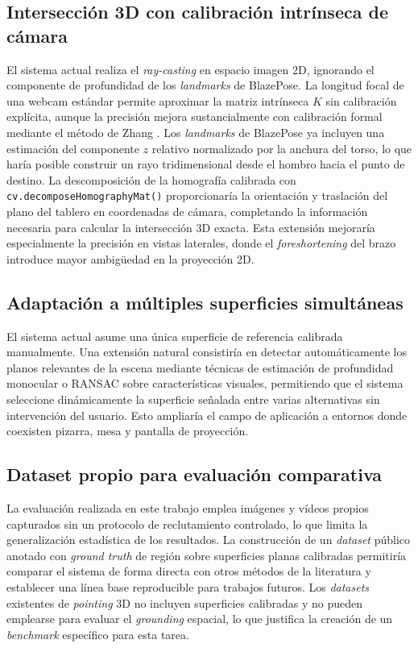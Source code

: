 \documentclass[12pt]{report} %
\begin{document}
\subsection{Intersección 3D con calibración intrínseca de cámara}

El sistema actual realiza el \textit{ray-casting} en espacio imagen 2D, ignorando el componente de profundidad de los \textit{landmarks} de BlazePose. La longitud focal de una webcam estándar permite aproximar la matriz intrínseca $K$ sin calibración explícita, aunque la precisión mejora sustancialmente con calibración formal mediante el método de Zhang \citep{zhang2000flexible}. Los \textit{landmarks} de BlazePose ya incluyen una estimación del componente $z$ relativo normalizado por la anchura del torso, lo que haría posible construir un rayo tridimensional desde el hombro hacia el punto de destino. La descomposición de la homografía calibrada con \texttt{cv.decomposeHomographyMat()} proporcionaría la orientación y traslación del plano del tablero en coordenadas de cámara, completando la información necesaria para calcular la intersección 3D exacta. Esta extensión mejoraría especialmente la precisión en vistas laterales, donde el \textit{foreshortening} del brazo introduce mayor ambigüedad en la proyección 2D.

\subsection{Adaptación a múltiples superficies simultáneas}

El sistema actual asume una única superficie de referencia calibrada manualmente. Una extensión natural consistiría en detectar automáticamente los planos relevantes de la escena mediante técnicas de estimación de profundidad monocular o RANSAC sobre características visuales, permitiendo que el sistema seleccione dinámicamente la superficie señalada entre varias alternativas sin intervención del usuario. Esto ampliaría el campo de aplicación a entornos donde coexisten pizarra, mesa y pantalla de proyección.

\subsection{Dataset propio para evaluación comparativa}

La evaluación realizada en este trabajo emplea imágenes y vídeos propios capturados sin un protocolo de reclutamiento controlado, lo que limita la generalización estadística de los resultados. La construcción de un \textit{dataset} público anotado con \textit{ground truth} de región sobre superficies planas calibradas permitiría comparar el sistema de forma directa con otros métodos de la literatura y establecer una línea base reproducible para trabajos futuros. Los \textit{datasets} existentes de \textit{pointing} 3D \citep{nakamura2023deepoint} no incluyen superficies calibradas y no pueden emplearse para evaluar el \textit{grounding} espacial, lo que justifica la creación de un \textit{benchmark} específico para esta tarea.
\end{document}

